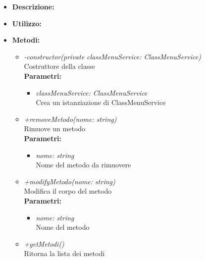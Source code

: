 \begin{itemize}
	\item \textbf{Descrizione:}\\
	
	\item \textbf{Utilizzo:}\\
	
	\item \textbf{Metodi:}
		\begin{itemize}
			\item \emph{-constructor(private classMenuService: ClassMenuService)}\\
    		Costruttore della classe\\
    		\textbf{Parametri:}
    		\begin{itemize}
    			\item \emph{classMenuService: ClassMenuService}\\
    			Crea un istanziazione di ClassMenuService
    		\end{itemize}
    		\item \emph{+removeMetodo(nome: string)}\\
    		Rimuove un metodo\\
    		\textbf{Parametri:}
    		\begin{itemize}
    			\item \emph{nome: string}\\
    			Nome del metodo da rimuovere
    		\end{itemize}
    		\item \emph{+modifyMetodo(nome: string)}\\
    		Modifica il corpo del metodo\\
    		\textbf{Parametri:}
    		\begin{itemize}
    			\item \emph{nome: string}\\
    			Nome del metodo
    		\end{itemize}
    		\item \emph{+getMetodi()}\\
    		Ritorna la lista dei metodi
		\end{itemize}
\end{itemize}